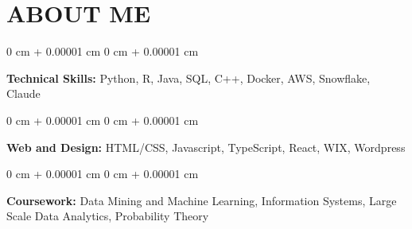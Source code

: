 \documentclass[10pt, letterpaper]{article}
\newenvironment{onecolentry}{
    \begin{adjustwidth}{
        0 cm + 0.00001 cm
    }{
        0 cm + 0.00001 cm
    }
}{
    \end{adjustwidth}
} %
\begin{document}
    
    \section{ABOUT ME}



        
        \begin{onecolentry}
            \textbf{Technical Skills:} Python, R, Java, SQL, C++, Docker, AWS, Snowflake, Claude
        \end{onecolentry}

        \vspace{0.2 cm}

        \begin{onecolentry}
            \textbf{Web and Design:} HTML/CSS, Javascript, TypeScript, React, WIX, Wordpress
        \end{onecolentry}

        \vspace{0.2 cm}

        \begin{onecolentry}
            \textbf{Coursework:} Data Mining and Machine Learning, Information Systems, Large Scale Data Analytics, Probability Theory
        \end{onecolentry}


    
\end{document}
